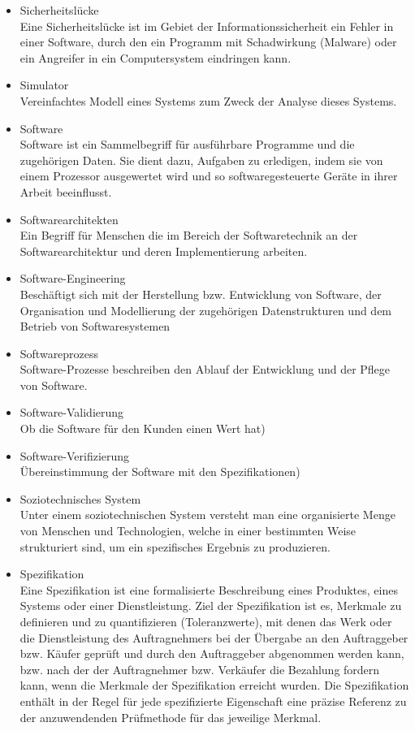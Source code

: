 \begin{itemize}
\item 	Sicherheitslücke\\Eine Sicherheitslücke ist im Gebiet der Informationssicherheit ein Fehler in einer Software, durch den ein Programm mit Schadwirkung (Malware) oder ein Angreifer in ein Computersystem eindringen kann.
\item 	Simulator\\Vereinfachtes Modell eines Systems zum Zweck der Analyse dieses Systems.
\item 	Software\\
Software ist ein Sammelbegriff für ausführbare Programme und die zugehörigen Daten. Sie dient dazu, Aufgaben zu erledigen, indem sie von einem Prozessor ausgewertet wird und so softwaregesteuerte Geräte in ihrer Arbeit beeinflusst.
\item 	Softwarearchitekten \\
Ein Begriff für Menschen die im Bereich der Softwaretechnik an der Softwarearchitektur und deren Implementierung arbeiten.
\item 	Software-Engineering\\
Beschäftigt sich mit der Herstellung bzw. Entwicklung von Software, der Organisation und Modellierung der zugehörigen Datenstrukturen und dem Betrieb von Softwaresystemen
\item 	Softwareprozess\\Software-Prozesse beschreiben den Ablauf der Entwicklung und der Pflege von Software.
\item 	Software-Validierung \\  Ob die Software für den Kunden einen Wert hat)
\item 	Software-Verifizierung \\ Übereinstimmung der Software mit den Spezifikationen)
\item 	Soziotechnisches System\\Unter einem soziotechnischen System versteht man eine organisierte Menge von Menschen und Technologien, welche in einer bestimmten Weise strukturiert sind, um ein spezifisches Ergebnis zu produzieren.
\item 	Spezifikation\\Eine Spezifikation  ist eine formalisierte Beschreibung eines Produktes, eines Systems oder einer Dienstleistung. Ziel der Spezifikation ist es, Merkmale zu definieren und zu quantifizieren (Toleranzwerte), mit denen das Werk oder die Dienstleistung des Auftragnehmers bei der Übergabe an den Auftraggeber bzw. Käufer geprüft und durch den Auftraggeber abgenommen werden kann, bzw. nach der der Auftragnehmer bzw. Verkäufer die Bezahlung fordern kann, wenn die Merkmale der Spezifikation erreicht wurden. Die Spezifikation enthält in der Regel für jede spezifizierte Eigenschaft eine präzise Referenz zu der anzuwendenden Prüfmethode für das jeweilige Merkmal.

\end{itemize}
